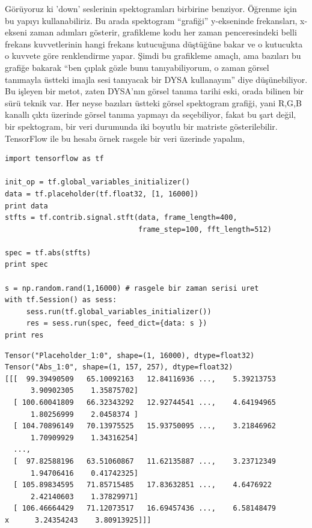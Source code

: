 \documentclass[12pt,fleqn]{article}\usepackage{../../common}
\begin{document}
Görüyoruz ki 'down' seslerinin spektogramları birbirine benziyor. Öğrenme
için bu yapıyı kullanabiliriz. Bu arada spektogram ``grafiği'' y-ekseninde
frekansları, x-ekseni zaman adımları gösterir, grafikleme kodu her zaman
penceresindeki belli frekans kuvvetlerinin hangi frekans kutucuğuna
düştüğüne bakar ve o kutucukta o kuvvete göre renklendirme yapar. Şimdi bu
grafikleme amaçlı, ama bazıları bu grafiğe bakarak ``ben çıplak gözle bunu
tanıyabiliyorum, o zaman görsel tanımayla üstteki imajla sesi tanıyacak bir
DYSA kullanayım'' diye düşünebiliyor. Bu işleyen bir metot, zaten DYSA'nın
görsel tanıma tarihi eski, orada bilinen bir sürü teknik var. Her neyse
bazıları üstteki görsel spektogram grafiği, yani R,G,B kanallı çıktı
üzerinde görsel tanıma yapmayı da seçebiliyor, fakat bu şart değil, bir
spektogram, bir veri durumunda iki boyutlu bir matriste gösterilebilir.
TensorFlow ile bu hesabı örnek rasgele bir veri üzerinde yapalım,

\begin{verbatim}
import tensorflow as tf

init_op = tf.global_variables_initializer()
data = tf.placeholder(tf.float32, [1, 16000])
print data
stfts = tf.contrib.signal.stft(data, frame_length=400, 
                               frame_step=100, fft_length=512)

spec = tf.abs(stfts)
print spec

s = np.random.rand(1,16000) # rasgele bir zaman serisi uret
with tf.Session() as sess:
     sess.run(tf.global_variables_initializer())
     res = sess.run(spec, feed_dict={data: s })  
print res
\end{verbatim}

\begin{verbatim}
Tensor("Placeholder_1:0", shape=(1, 16000), dtype=float32)
Tensor("Abs_1:0", shape=(1, 157, 257), dtype=float32)
[[[  99.39490509   65.10092163   12.84116936 ...,    5.39213753
      3.90902305    1.35875702]
  [ 100.60041809   66.32343292   12.92744541 ...,    4.64194965
      1.80256999    2.0458374 ]
  [ 104.70896149   70.13975525   15.93750095 ...,    3.21846962
      1.70909929    1.34316254]
  ..., 
  [  97.82588196   63.51060867   11.62135887 ...,    3.23712349
      1.94706416    0.41742325]
  [ 105.89834595   71.85715485   17.83632851 ...,    4.6476922
      2.42140603    1.37829971]
  [ 106.46664429   71.12073517   16.69457436 ...,    6.58148479
x      3.24354243    3.80913925]]]
\end{verbatim}
\end{document}
